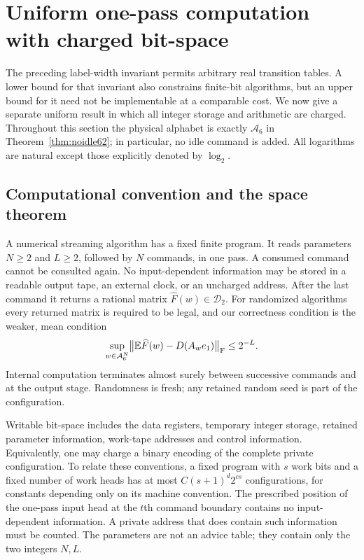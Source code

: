 \section{Uniform one-pass computation with charged bit-space}\label{sec:streaming64}
The preceding label-width invariant permits arbitrary real transition
tables. A lower bound for that invariant also constrains finite-bit
algorithms, but an upper bound for it need not be implementable at a
comparable cost. We now give a separate uniform result in which all
integer storage and arithmetic are charged. Throughout this section the
physical alphabet is exactly $\mathcal A_6$ in
Theorem~\ref{thm:noidle62}; in particular, no idle command is added.
All logarithms are natural except those explicitly denoted by $\log_2$.

\subsection{Computational convention and the space theorem}
A numerical streaming algorithm has a fixed finite program. It reads
parameters $N\ge2$ and $L\ge2$, followed by $N$ commands, in one pass.
A consumed command cannot be consulted again. No input-dependent
information may be stored in a readable output tape, an external
clock, or an uncharged address. After the last command it returns a
rational matrix $\widehat F(w)\in\mathcal D_2$. For randomized
algorithms every returned matrix is required to be legal, and our
correctness condition is the weaker, mean condition
\begin{equation}\label{eq:streammean64}
 \sup_{w\in\mathcal A_6^N}
 \bigl\|\mathbb E\widehat F(w)-D(A_we_1)\bigr\|_{\rm F}\le2^{-L}.
\end{equation}
Internal computation terminates almost surely between successive
commands and at the output stage. Randomness is fresh; any retained
random seed is part of the configuration.

Writable bit-space includes the data registers, temporary integer
storage, retained parameter information, work-tape addresses and
control information. Equivalently, one may charge a binary encoding of
the complete private configuration. To relate these conventions,
a fixed program with $s$ work bits and a fixed number of work heads
has at most $C(s+1)^d2^{cs}$ configurations, for constants depending
only on its machine convention. The prescribed position of the
one-pass input head at the $t$th command boundary contains no
input-dependent information. A private address that does contain such
information must be counted. The parameters are not an advice table;
they contain only the two integers $N,L$.

